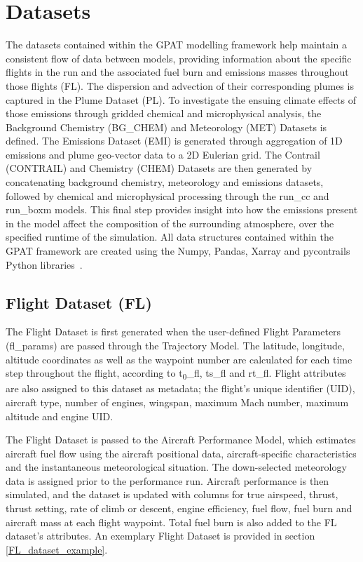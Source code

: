 \section{Datasets}
The datasets contained within the GPAT modelling framework help maintain a consistent flow of data between models, providing information about the specific flights in the run and the associated fuel burn and emissions masses throughout those flights (FL). The dispersion and advection of their corresponding plumes is captured in the Plume Dataset (PL). To investigate the ensuing climate effects of those emissions through gridded chemical and microphysical analysis, the Background Chemistry (BG\_CHEM) and Meteorology (MET) Datasets is defined. The Emissions Dataset (EMI) is generated through aggregation of 1D emissions and plume geo-vector data to a 2D Eulerian grid. The Contrail (CONTRAIL) and Chemistry (CHEM) Datasets are then generated by concatenating background chemistry, meteorology and emissions datasets, followed by chemical and microphysical processing through the run\_cc and run\_boxm models. This final step provides insight into how the emissions present in the model affect the composition of the surrounding atmosphere, over the specified runtime of the simulation. All data structures contained within the GPAT framework are created using the Numpy, Pandas, Xarray and pycontrails Python libraries~\cite{Numpy2020, Pandas2024, Xarray2024, pycontrails2024}. 

\subsection{Flight Dataset (FL)}
The Flight Dataset is first generated when the user-defined Flight Parameters (fl\_params) are passed through the Trajectory Model. The latitude, longitude, altitude coordinates as well as the waypoint number are calculated for each time step throughout the flight, according to t\textsubscript{0}\_fl, ts\_fl and rt\_fl. Flight attributes are also assigned to this dataset as metadata; the flight's unique identifier (UID), aircraft type, number of engines, wingspan, maximum Mach number, maximum altitude and engine UID.

The Flight Dataset is passed to the Aircraft Performance Model, which estimates aircraft fuel flow using the aircraft positional data, aircraft-specific characteristics and the instantaneous meteorological situation. The down-selected meteorology data is assigned prior to the performance run. Aircraft performance is then simulated, and the dataset is updated with columns for true airspeed, thrust, thrust setting, rate of climb or descent, engine efficiency, fuel flow, fuel burn and aircraft mass at each flight waypoint. Total fuel burn is also added to the FL dataset's attributes. An exemplary Flight Dataset is provided in section \ref{FL_dataset_example}. 

